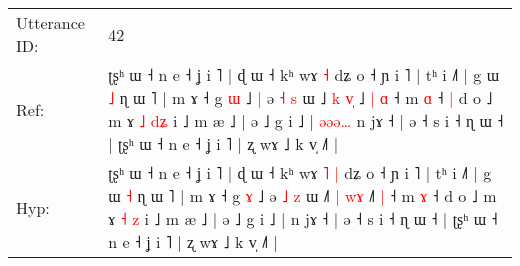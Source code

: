 \documentclass[10pt]{article}
\DeclareRobustCommand{\hl}[1]{{\textcolor{red}{#1}}}
\begin{document}
\begin{longtable}{ll}
 \\
\midrule
Utterance ID: & 42 \\
Ref: & ʈʂʰ ɯ ˧ n e ˧ ʝ i ˥ | ɖ ɯ ˧ kʰ wɤ\hl{}\hl{} \hl{˧} dʑ o ˧ ɲ i ˥ | tʰ i ˩˥ | g ɯ \hl{˩} ɳ ɯ ˥ | m ɤ ˧ g \hl{ɯ} ˩\hl{ }\hl{|} ə \hl{˧} \hl{s} ɯ ˩\hl{} \hl{k} \hl{v}\hl{̩} ˩\hl{ }\hl{|} \hl{ɑ} ˧ m \hl{ɑ} ˧\hl{ }\hl{|} d o ˩ m ɤ \hl{˩} \hl{d}\hl{ʑ} i ˩ m æ ˩ | ə ˩ g i ˩ |\hl{ }\hl{ə}\hl{ə}\hl{ə}\hl{…} n jɤ ˧ | ə ˧ s i ˧ ɳ ɯ ˧ | ʈʂʰ ɯ ˧ n e ˧ ʝ i ˥ | ʐ wɤ ˩ k v̩ ˩˥ |
 \\
Hyp: & ʈʂʰ ɯ ˧ n e ˧ ʝ i ˥ | ɖ ɯ ˧ kʰ wɤ\hl{ }\hl{˥} \hl{|} dʑ o ˧ ɲ i ˥ | tʰ i ˩˥ | g ɯ \hl{˧} ɳ ɯ ˥ | m ɤ ˧ g \hl{ɤ} ˩\hl{}\hl{} ə \hl{˩} \hl{z} ɯ ˩\hl{˥} \hl{|} \hl{w}\hl{ɤ} ˩\hl{}\hl{˥} \hl{|} ˧ m \hl{ɤ} ˧\hl{}\hl{} d o ˩ m ɤ \hl{˧} \hl{}\hl{z} i ˩ m æ ˩ | ə ˩ g i ˩ |\hl{}\hl{}\hl{}\hl{}\hl{} n jɤ ˧ | ə ˧ s i ˧ ɳ ɯ ˧ | ʈʂʰ ɯ ˧ n e ˧ ʝ i ˥ | ʐ wɤ ˩ k v̩ ˩˥ |
 \\
\midrule
\end{longtable}
\end{document}
